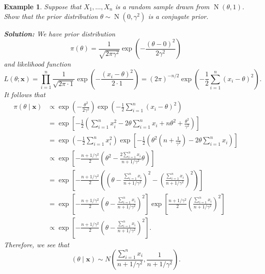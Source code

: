 \documentclass[10pt]{article}
\DeclareMathOperator{\Nor}{N}
\theoremstyle{newstyle}
\newtheorem{exmp}[thm]{Example}
\begin{document}
\begin{exmp}
Suppose that $X_1, \dots, X_n$ is a random sample drawn from $\Nor(\theta, 1)$. Show that the 
prior distribution $\theta \sim \Nor(0, \gamma^2)$ is a conjugate prior. 

{\color{blue}
{\bf Solution:} We have prior distribution 
\[ \pi(\theta) = \frac{1}{\sqrt{2\pi\gamma^2}} \exp \left( -\frac{(\theta - 0)^2}{2\gamma^2} \right) \]
and likelihood function 
\[ L(\theta; \mathbf x) = \prod_{i=1}^n \frac{1}{\sqrt{2\pi \cdot 1}} \exp \left( -\frac{(x_i - \theta)^2}{2 \cdot 1} \right) = (2\pi)^{-n/2} \exp \left( -\frac12 \sum_{i=1}^n (x_i- \theta)^2 \right). \]
It follows that 
\begin{align*}
    \pi(\theta \mid \mathbf x) 
    &\propto \exp\left( -\frac{\theta^2}{2\gamma^2} \right) \exp \left( -\frac12 \sum_{i=1}^n 
    (x_i - \theta)^2 \right) \\
    &= \exp \left[ -\frac12 \left( \sum_{i=1}^n x_i^2 - 2\theta \sum_{i=1}^n x_i + n\theta^2 
    + \frac{\theta^2}{\gamma^2} \right) \right] \\
    &= \exp \left( -\frac12 \sum_{i=1}^n x_i^2 \right) \exp \left[ -\frac12 \left( \theta^2 
    \left( n + \frac1{\gamma^2} \right) - 2\theta \sum_{i=1}^n x_i \right) \right] \\
    &\propto \exp \left[ -\frac{n+1/\gamma^2}2 \left( \theta^2 - \frac{2\sum_{i=1}^n x_i}{n+1/\gamma^2}
    \theta \right) \right] \\
    &= \exp \left[ -\frac{n+1/\gamma^2}2 \left( \left( \theta - \frac{\sum_{i=1}^n x_i}{n+1/\gamma^2} 
    \right)^2 - \left( \frac{\sum_{i=1}^n x_i}{n+1/\gamma^2} \right)^2 \right) \right] \\
    &= \exp \left[ -\frac{n+1/\gamma^2}2 \left( \theta - \frac{\sum_{i=1}^n x_i}{n+1/\gamma^2} \right)^2 
    \right] \exp \left[ \frac{n+1/\gamma^2}2 \left( \frac{\sum_{i=1}^n x_i}{n+1/\gamma^2} \right)^2 
    \right] \\
    &\propto \exp \left[ -\frac{n+1/\gamma^2}2 \left( \theta - \frac{\sum_{i=1}^n x_i}{n+1/\gamma^2}
    \right)^2 \right].
\end{align*}
Therefore, we see that 
\[ (\theta \mid \mathbf x) \sim N \left( \frac{\sum_{i=1}^n x_i}{n+1/\gamma^2}, \frac{1}{n+1/\gamma^2} 
\right). \]}
\end{exmp}
\end{document}
